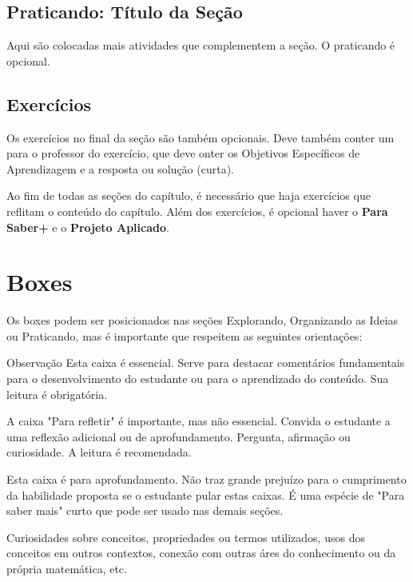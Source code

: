 \def\currentcolor{session2}
\subsection{Praticando: Título da Seção}

Aqui são colocadas mais atividades que complementem a seção. O praticando é opcional.

\def\currentcolor{primario}
\subsection{Exercícios}

Os exercícios no final da seção são também opcionais. Deve também conter um para o professor do exercício, que deve onter os Objetivos Específicos de Aprendizagem e a resposta ou solução (curta).


Ao fim de todas as seções do capítulo, é necessário que haja exercícios que reflitam o conteúdo do capítulo. Além dos exercícios, é opcional haver o \textcolor{session3}{\textbf{Para Saber+}} e o \textcolor{cor2}{\textbf{Projeto Aplicado}}.

\def\currentcolor{session3}
\section{Boxes}

Os boxes podem ser posicionados nas seções Explorando, Organizando as Ideias ou Praticando, mas é importante que respeitem as seguintes orientações:

\begin{observation}{Observação}
Esta caixa é essencial. Serve para destacar comentários fundamentais para o desenvolvimento do estudante ou para o aprendizado do conteúdo. Sua leitura é obrigatória.
\end{observation}
\clearpage
\begin{reflection}
A caixa "Para refletir"{} é importante, mas não essencial. Convida o estudante a uma reflexão adicional ou de aprofundamento. Pergunta, afirmação ou curiosidade. A leitura é recomendada.
\end{reflection}

\begin{knowledge}
Esta caixa é para aprofundamento. Não traz grande prejuízo para o cumprimento da habilidade proposta se o estudante pular estas caixas. É uma espécie de "Para saber mais"{ curto que pode ser usado nas demais seções}.

Curiosidades sobre conceitos, propriedades ou termos utilizados, usos dos conceitos em outros contextos, conexão com outras áres do conhecimento ou da própria matemática, etc.
\end{knowledge}